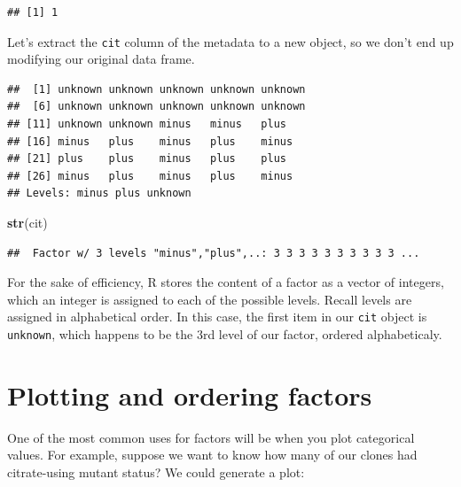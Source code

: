 \documentclass[]{book}
\newenvironment{Shaded}{\begin{snugshade}}{\end{snugshade}}
\newcommand{\KeywordTok}[1]{\textcolor[rgb]{0.13,0.29,0.53}{\textbf{#1}}}
\newcommand{\NormalTok}[1]{#1}
\newcommand{\OperatorTok}[1]{\textcolor[rgb]{0.81,0.36,0.00}{\textbf{#1}}}
\newcommand{\StringTok}[1]{\textcolor[rgb]{0.31,0.60,0.02}{#1}}
\begin{document}
\begin{verbatim}
## [1] 1
\end{verbatim}

Let's extract the \texttt{cit} column of the metadata to a new object, so we don't end up modifying our original data frame.

\begin{Shaded}
\end{Shaded}

\begin{verbatim}
##  [1] unknown unknown unknown unknown unknown
##  [6] unknown unknown unknown unknown unknown
## [11] unknown unknown minus   minus   plus   
## [16] minus   plus    minus   plus    minus  
## [21] plus    plus    minus   plus    plus   
## [26] minus   plus    minus   plus    minus  
## Levels: minus plus unknown
\end{verbatim}

\begin{Shaded}
\begin{Highlighting}[]
\KeywordTok{str}\NormalTok{(cit)}
\end{Highlighting}
\end{Shaded}

\begin{verbatim}
##  Factor w/ 3 levels "minus","plus",..: 3 3 3 3 3 3 3 3 3 3 ...
\end{verbatim}

For the sake of efficiency, R stores the content of a factor as a vector of integers, which an integer is assigned to each of the possible levels. Recall levels are assigned in alphabetical order. In this case, the first item in our \texttt{cit} object is \texttt{unknown}, which happens to be the 3rd level of our factor, ordered alphabeticaly.

\hypertarget{plotting-and-ordering-factors}{%
\section{Plotting and ordering factors}\label{plotting-and-ordering-factors}}

One of the most common uses for factors will be when you plot categorical values. For example, suppose we want to know how many of our clones had citrate-using mutant status? We could generate a plot:
\end{document}
